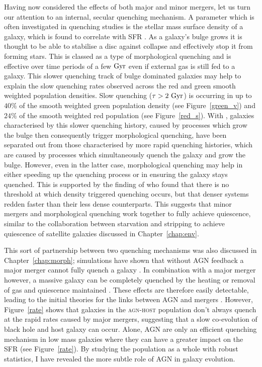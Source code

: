 Having now considered the effects of both major and minor mergers, let us turn our attention to an internal, secular quenching mechanism. A parameter which is often investigated in quenching studies is the stellar mass surface density of a galaxy, which is found to correlate with SFR \citep{barro13b, whitaker16}. As a galaxy's bulge grows it is thought to be able to stabilise a disc against collapse and effectively stop it from forming stars. This is classed as a type of morphological quenching and is effective over time periods of a few $\rm{Gyr}$ \citep{Fang13} even if external gas is still fed to a galaxy. This slower quenching track of bulge dominated galaxies may help to explain the slow quenching rates observed across the red and green smooth weighted population densities. Slow quenching ($\tau>2~\rm{Gyr}$) is occurring in up to $40\%$ of the smooth weighted green population density (see Figure~\ref{green_v}) and $24\%$ of the smooth weighted red population (see Figure~\ref{red_s}). With \starpy, galaxies characterised by this slower quenching history, caused by processes which grow the bulge then consequently trigger morphological quenching, have been separated out from those characterised by more rapid quenching histories, which are caused by processes which simultaneously quench the galaxy and grow the bulge. However, even in the latter case, morphological quenching may help in either speeding up the quenching process or in ensuring the galaxy stays quenched. This is supported by the finding of \cite{abramson16} who found that there is no threshold at which density triggered quenching occurs, but that denser systems redden faster than their less dense counterparts. This suggests that minor mergers and morphological quenching work together to fully achieve quiescence, similar to the collaboration between starvation and stripping to achieve quiescence of satellite galaxies discussed in Chapter~\ref{chap:env}. 

This sort of partnership between two quenching mechanisms was also discussed in Chapter~\ref{chap:morph}; simulations have shown that without AGN feedback a major merger cannot fully quench a galaxy \citep{springel05b}. In combination with a major merger however, a massive galaxy can be completely quenched by the heating or removal of gas and quiescence maintained \citep{conselice03, springel05b, hopkins08a, pontzen16}. These effects are therefore easily detectable, leading to the initial theories for the links between AGN and mergers \citep{merritt01, hopkins06b, hopkins08a, hopkins08b, peng07, jahnke11}. However, Figure~\ref{rate} shows that galaxies in the \textsc{agn-host} population don't always quench at the rapid rates caused by major mergers, suggesting that a slow co-evolution of black hole and host galaxy can occur. Alone, AGN are only an efficient quenching mechanism in low mass galaxies where they can have a greater impact on the SFR (see Figure~\ref{rate}). By studying the population as a whole with robust statistics, I have revealed the more subtle role of AGN in galaxy evolution. 

